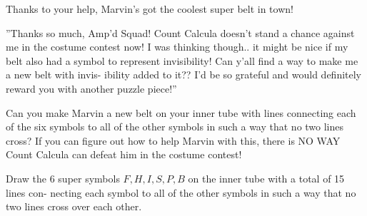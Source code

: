 


Thanks to your help, Marvin’s got the coolest super belt in town!

”Thanks so much, Amp’d Squad! Count Calcula doesn’t stand
a chance against me in the costume contest now! I was thinking
though.. it might be nice if my belt also had a symbol to represent
invisibility! Can y’all find a way to make me a new belt with invis-
ibility added to it?? I’d be so grateful and would definitely reward
you with another puzzle piece!”

Can you make Marvin a new belt on your inner tube with lines connecting
each of the six symbols to all of the other symbols in such a way that no two
lines cross? If you can figure out how to help Marvin with this, there is NO
WAY Count Calcula can defeat him in the costume contest!

Draw the 6 super symbols \(F,H,I,S,P,B\) on the inner tube with a total of 15 lines con-
necting each symbol to all of the other symbols in such a way that no two
lines cross over each other.
